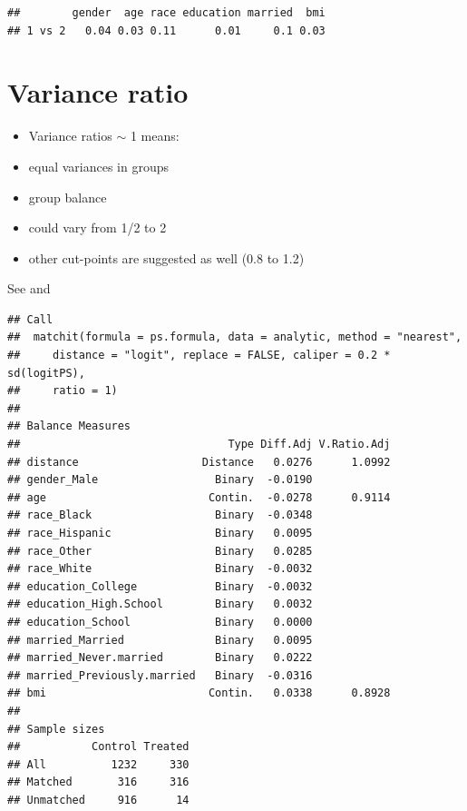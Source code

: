 \documentclass[
]{book}
\newenvironment{Shaded}{\begin{snugshade}}{\end{snugshade}}
\newcommand{\AttributeTok}[1]{\textcolor[rgb]{0.77,0.63,0.00}{#1}}
\newcommand{\ConstantTok}[1]{\textcolor[rgb]{0.00,0.00,0.00}{#1}}
\newcommand{\FunctionTok}[1]{\textcolor[rgb]{0.00,0.00,0.00}{#1}}
\newcommand{\NormalTok}[1]{#1}
\newcommand{\OtherTok}[1]{\textcolor[rgb]{0.56,0.35,0.01}{#1}}
\newcommand{\SpecialCharTok}[1]{\textcolor[rgb]{0.00,0.00,0.00}{#1}}
\providecommand{\tightlist}{%
  \setlength{\itemsep}{0pt}\setlength{\parskip}{0pt}}
\begin{document}
\begin{verbatim}
##        gender  age race education married  bmi
## 1 vs 2   0.04 0.03 0.11      0.01     0.1 0.03
\end{verbatim}

\hypertarget{variance-ratio-1}{%
\section{Variance ratio}\label{variance-ratio-1}}

\begin{itemize}
\tightlist
\item
  Variance ratios \(\sim\) 1 means:
\item
  equal variances in groups
\item
  group balance
\item
  could vary from 1/2 to 2
\item
  other cut-points are suggested as well (0.8 to 1.2)
\end{itemize}

See \citet{stuart2010matching} and \citet{austin2009balance}

\begin{Shaded}
\end{Shaded}

\begin{verbatim}
## Call
##  matchit(formula = ps.formula, data = analytic, method = "nearest", 
##     distance = "logit", replace = FALSE, caliper = 0.2 * sd(logitPS), 
##     ratio = 1)
## 
## Balance Measures
##                                Type Diff.Adj V.Ratio.Adj
## distance                   Distance   0.0276      1.0992
## gender_Male                  Binary  -0.0190            
## age                         Contin.  -0.0278      0.9114
## race_Black                   Binary  -0.0348            
## race_Hispanic                Binary   0.0095            
## race_Other                   Binary   0.0285            
## race_White                   Binary  -0.0032            
## education_College            Binary  -0.0032            
## education_High.School        Binary   0.0032            
## education_School             Binary   0.0000            
## married_Married              Binary   0.0095            
## married_Never.married        Binary   0.0222            
## married_Previously.married   Binary  -0.0316            
## bmi                         Contin.   0.0338      0.8928
## 
## Sample sizes
##           Control Treated
## All          1232     330
## Matched       316     316
## Unmatched     916      14
\end{verbatim}
\end{document}
